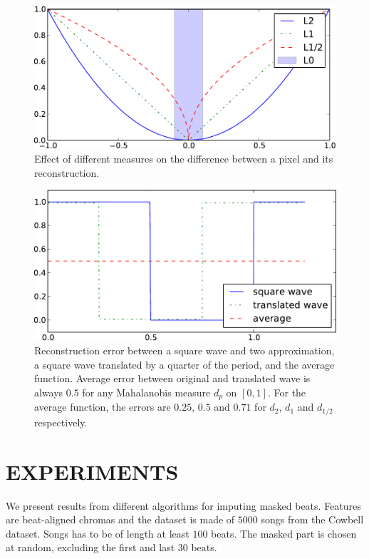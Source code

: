 \documentclass{article}
\begin{document}
\begin{figure}[t]
\begin{center}
\includegraphics[width=.95\columnwidth]{measures}
\end{center}
\caption{Effect of different measures on the difference between a pixel
and its reconstruction.
\label{fig:measures}}
\end{figure}

\begin{figure}[t]
\begin{center}
\includegraphics[width=.90\columnwidth]{square}
\end{center}
\caption{Reconstruction error between a square wave and two approximation,
a square wave translated by a quarter of the period, and the average
function. Average error between original and translated wave is always $0.5$
for any Mahalanobis measure $d_p$ on $[0,1]$. 
For the average function, the errors are
$0.25$, $0.5$ and $0.71$ for $d_2$, $d_1$ and $d_{1/2}$ respectively.
\label{fig:square}}
\end{figure}

\section{EXPERIMENTS}
\label{sec:exp}
We present results from different algorithms for imputing masked beats.
Features are beat-aligned chromas and the dataset is made of $5000$ songs
from the Cowbell dataset. Songs has to be of length at least $100$ beats.
The masked part is chosen at random, excluding the first and last $30$ beats.
\end{document}
